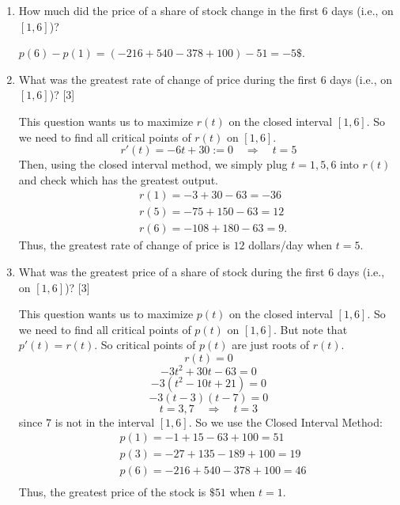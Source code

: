 \documentclass{ximera}
\begin{document}
\begin{problem}
\begin{enumerate}
		\item  How much did the price of a share of stock change in the first $6$ days (i.e., on $[1,6]$)?
		\begin{explanation}
			$p(6) - p(1) = (-216+540-378+100) - 51 = -5\$. $
		\end{explanation}


		

	\item  What was the greatest rate of change of price during the first $6$ days (i.e., on $[1,6]$)?
		[3]
		\begin{explanation}
			This question wants us to maximize $r(t)$ on the closed interval $[1,6]$.
			So we need to find all critical points of $r(t)$ on $[1,6]$.
			$$ r'(t) = -6t+30:=0 \quad \Longrightarrow \quad t=5  $$
			Then, using the closed interval method, we simply plug $t=1,5,6$ into $r(t)$ and check which has the greatest output.
			\begin{align*}
				&r(1) = -3+30-63=-36  \\
				&r(5) = -75+150-63=12  \\
				&r(6) = -108+180-63=9.
			\end{align*}
			Thus, the greatest rate of change of price is $12$ dollars/day when $t=5$.
		\end{explanation}




	\item  What was the greatest price of a share of stock during the first $6$ days (i.e., on $[1,6]$)?
		[3]
		\begin{explanation}
			This question wants us to maximize $p(t)$ on the closed interval $[1,6]$.
			So we need to find all critical points of $p(t)$ on $[1,6]$.
			But note that $p'(t) = r(t)$.  So critical points of $p(t)$ are just roots of $r(t)$.
			$$ r(t) = 0 $$
			$$ -3t^2+30t-63 = 0 $$
			$$ -3(t^2-10t+21)=0 $$
			$$ -3(t-3)(t-7) = 0 $$
			$$ t=3,7 \quad \Longrightarrow \quad t=3 $$
			since $7$ is not in the interval $[1,6]$.
			So we use the Closed Interval Method:
			\begin{align*}
				&p(1) = -1+15-63+100 = 51  \\
				&p(3) = -27 + 135 - 189 + 100 = 19  \\
				&p(6) = -216+540-378+100=46  \\
			\end{align*}
			Thus, the greatest price of the stock is $\$51$ when $t=1$.
		\end{explanation}
	\end{enumerate}
\end{problem}
\end{document}
